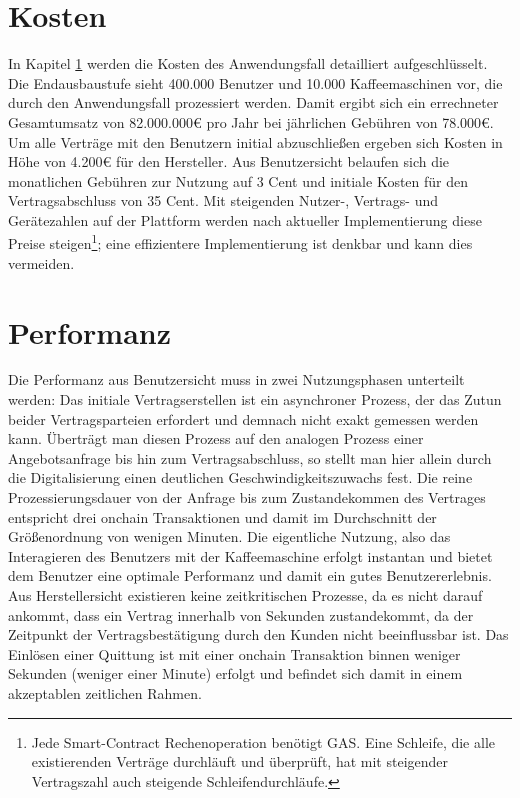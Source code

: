 \section{Kosten}
\label{sec:results:costs}
In Kapitel \ref{sec:results:costs} werden die Kosten des Anwendungsfall detailliert aufgeschlüsselt. Die Endausbaustufe sieht 400.000 Benutzer und 10.000 Kaffeemaschinen vor, die durch den Anwendungsfall prozessiert werden. Damit ergibt sich ein errechneter Gesamtumsatz von 82.000.000€ pro Jahr bei jährlichen Gebühren von 78.000€. Um alle Verträge mit den Benutzern initial abzuschließen ergeben sich Kosten in Höhe von 4.200€ für den Hersteller. Aus Benutzersicht belaufen sich die monatlichen Gebühren zur Nutzung auf 3 Cent und initiale Kosten für den Vertragsabschluss von 35 Cent. Mit steigenden Nutzer-, Vertrags- und Gerätezahlen auf der Plattform werden nach aktueller Implementierung diese Preise steigen\footnote{Jede Smart-Contract Rechenoperation benötigt GAS. Eine Schleife, die alle existierenden Verträge durchläuft und überprüft, hat mit steigender Vertragszahl auch steigende Schleifendurchläufe.}; eine effizientere Implementierung ist denkbar und kann dies vermeiden.

\section{Performanz}
\label{sec:results:performance}
Die Performanz aus Benutzersicht muss in zwei Nutzungsphasen unterteilt werden: Das initiale Vertragserstellen ist ein asynchroner Prozess, der das Zutun beider Vertragsparteien erfordert und demnach nicht exakt gemessen werden kann. Überträgt man diesen Prozess auf den analogen Prozess einer Angebotsanfrage bis hin zum Vertragsabschluss, so stellt man hier allein durch die Digitalisierung einen deutlichen Geschwindigkeitszuwachs fest. Die reine Prozessierungsdauer von der Anfrage bis zum Zustandekommen des Vertrages entspricht drei onchain Transaktionen und damit im Durchschnitt der Größenordnung von wenigen Minuten. Die eigentliche Nutzung, also das Interagieren des Benutzers mit der Kaffeemaschine erfolgt instantan und bietet dem Benutzer eine optimale Performanz und damit ein gutes Benutzererlebnis.\\
Aus Herstellersicht existieren keine zeitkritischen Prozesse, da es nicht darauf ankommt, dass ein Vertrag innerhalb von Sekunden zustandekommt, da der Zeitpunkt der Vertragsbestätigung durch den Kunden nicht beeinflussbar ist. Das Einlösen einer Quittung ist mit einer onchain Transaktion binnen weniger Sekunden (weniger einer Minute) erfolgt und befindet sich damit in einem akzeptablen zeitlichen Rahmen.

